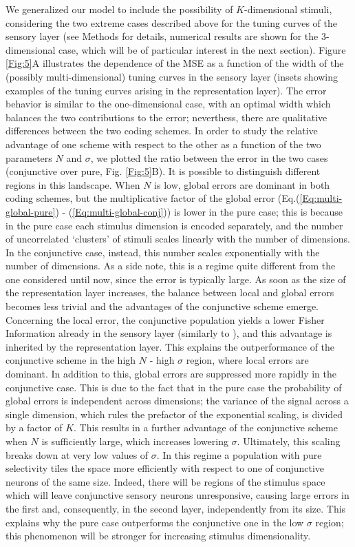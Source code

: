 \documentclass[a4paper]{article}%
\begin{document}
We generalized our model to include the possibility of $K$-dimensional
stimuli, considering the two extreme cases described above for the tuning curves of the sensory layer (see Methods for details, numerical results are shown for the 3-dimensional case, which will be of particular interest in the next section). Figure \ref{Fig:5}A illustrates the
dependence of the MSE as a function of the width of the (possibly
multi-dimensional) tuning curves in the sensory layer (insets showing examples of the tuning curves arising in the representation layer).
The error behavior is similar to the one-dimensional case, with an optimal width which balances the two contributions to the error; neverthess, there are qualitative differences between the two coding schemes. In order to study the relative advantage of one scheme with respect to the other as a function of the two parameters $N$ and $\sigma$, we plotted the ratio between the error in the two cases (conjunctive over pure, Fig. \ref{Fig:5}B). It is possible to distinguish different regions in this landscape. When $N$ is low, global errors are dominant in both coding schemes, but the multiplicative factor of the global error (Eq.(\ref{Eq:multi-global-pure}) - (\ref{Eq:multi-global-conj}))  is lower in the pure case; this is because in the pure case each stimulus dimension is encoded separately, and the number of uncorrelated `clusters' of stimuli scales linearly with the number of dimensions. In the conjunctive case, instead, this number scales exponentially with the number of dimensions. As a side note, this is a regime quite different from the one considered until now, since the error is typically large. As soon as the size of the representation layer increases, the balance between local and global errors becomes less trivial and the advantages of the conjunctive scheme emerge. Concerning the local error, the conjunctive population yields a lower Fisher Information already in the sensory layer (similarly to \cite{Finkelstein2018OptimalBats}), and this advantage is inherited by the representation layer. This explains the outperformance of the conjunctive scheme in the high $N$ - high $\sigma$ region, where local errors are dominant. In addition to this, global errors are suppressed more rapidly in the conjunctive case. This is due to the fact that in the pure case the probability of global errors is independent across dimensions; the variance of the signal across a single dimension, which rules the prefactor of the exponential scaling, is divided by a factor of $K$. This results in a further advantage of the conjunctive scheme when $N$ is sufficiently large, which increases lowering  $\sigma$. Ultimately, this scaling breaks down at very low values of $\sigma$. In this regime a population with pure selectivity tiles the space more efficiently with respect to one of conjunctive neurons of the same size. Indeed, there will be regions of the stimulus space which will leave conjunctive sensory neurons unresponsive, causing  large errors in the first and, consequently, in the second layer, independently from its size. This explains why the pure case outperforms the conjunctive one in the low $\sigma$ region; this phenomenon will be stronger for increasing stimulus dimensionality. 
\end{document}

